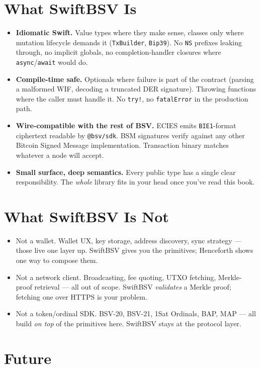 \documentclass[a4paper, 11pt, openany]{book}
\begin{document}
\section{What SwiftBSV Is}

\begin{itemize}
\item \textbf{Idiomatic Swift.} Value types where they make sense, classes only where mutation lifecycle demands it (\texttt{TxBuilder}, \texttt{Bip39}). No \texttt{NS} prefixes leaking through, no implicit globals, no completion-handler closures where \texttt{async}/\texttt{await} would do.
\item \textbf{Compile-time safe.} Optionals where failure is part of the contract (parsing a malformed WIF, decoding a truncated DER signature). Throwing functions where the caller must handle it. No \texttt{try!}, no \texttt{fatalError} in the production path.
\item \textbf{Wire-compatible with the rest of BSV.} ECIES emits \texttt{BIE1}-format ciphertext readable by \texttt{@bsv/sdk}. BSM signatures verify against any other Bitcoin Signed Message implementation. Transaction binary matches whatever a node will accept.
\item \textbf{Small surface, deep semantics.} Every public type has a single clear responsibility. The \emph{whole} library fits in your head once you've read this book.
\end{itemize}

\section{What SwiftBSV Is Not}

\begin{itemize}
\item Not a wallet. Wallet UX, key storage, address discovery, sync strategy --- those live one layer up. SwiftBSV gives you the primitives; Henceforth shows one way to compose them.
\item Not a network client. Broadcasting, fee quoting, UTXO fetching, Merkle-proof retrieval --- all out of scope. SwiftBSV \emph{validates} a Merkle proof; fetching one over HTTPS is your problem.
\item Not a token/ordinal SDK. BSV-20, BSV-21, 1Sat Ordinals, BAP, MAP --- all build \emph{on top} of the primitives here. SwiftBSV stays at the protocol layer.
\end{itemize}

\section{Future}
\end{document}
